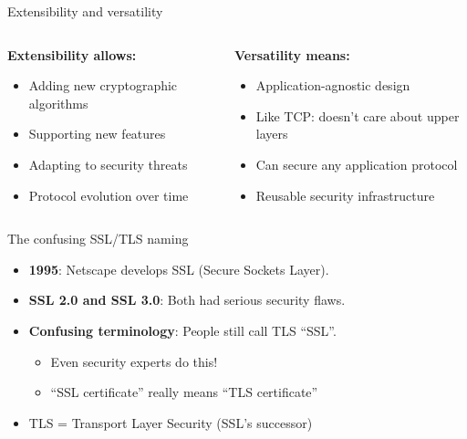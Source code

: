 \documentclass[aspectratio=169, lualatex, handout]{beamer}
\begin{document}
\begin{frame}{Extensibility and versatility}
	\begin{columns}[c]
		\begin{column}{0.5\textwidth}
			\textbf{Extensibility allows:}
			\begin{itemize}[<+->]
				\item Adding new cryptographic algorithms
				\item Supporting new features
				\item Adapting to security threats
				\item Protocol evolution over time
			\end{itemize}
		\end{column}
		\begin{column}{0.5\textwidth}
			\textbf{Versatility means:}
			\begin{itemize}[<+->]
				\item Application-agnostic design
				\item Like TCP: doesn't care about upper layers
				\item Can secure any application protocol
				\item Reusable security infrastructure
			\end{itemize}
		\end{column}
	\end{columns}
\end{frame}

\begin{frame}{The confusing SSL/TLS naming}
	\begin{itemize}[<+->]
		\item \textbf{1995}: Netscape develops SSL (Secure Sockets Layer).
		\item \textbf{SSL 2.0 and SSL 3.0}: Both had serious security flaws.
		\item \textbf{Confusing terminology}: People still call TLS ``SSL''.
		      \begin{itemize}
			      \item Even security experts do this!
			      \item ``SSL certificate'' really means ``TLS certificate''
		      \end{itemize}
		\item TLS = Transport Layer Security (SSL's successor)
	\end{itemize}
\end{frame}
\end{document}
